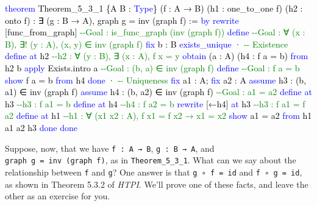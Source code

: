 \documentclass[
  letterpaper,
  DIV=11,
  numbers=noendperiod]{scrreprt}
\newenvironment{Shaded}{\begin{snugshade}}{\end{snugshade}}
\newcommand{\CommentTok}[1]{\textcolor[rgb]{0.37,0.37,0.37}{#1}}
\newcommand{\KeywordTok}[1]{\textcolor[rgb]{0.00,0.23,0.31}{#1}}
\newcommand{\NormalTok}[1]{\textcolor[rgb]{0.00,0.23,0.31}{#1}}
\renewcommand{\NormalTok}[1]{\textcolor[HTML]{000000}{#1}}
\renewcommand{\KeywordTok}[1]{\textcolor[HTML]{0000FF}{#1}}
\renewcommand{\CommentTok}[1]{\textcolor[HTML]{008000}{#1}}
\theoremstyle{remark}
\begin{document}
\begin{Shaded}
\begin{Highlighting}[]
\KeywordTok{theorem}\NormalTok{ Theorem\_5\_3\_1 \{A B : }\KeywordTok{Type}\NormalTok{\}}
\NormalTok{    (f : A → B) (h1 : one\_to\_one f) (h2 : onto f) :}
\NormalTok{    ∃ (g : B → A), graph g = inv (graph f) := }\KeywordTok{by}
  \KeywordTok{rewrite}\NormalTok{ [func\_from\_graph]   }\CommentTok{{-}{-}Goal : is\_func\_graph (inv (graph f))}
  \KeywordTok{define}        \CommentTok{{-}{-}Goal : ∀ (x : B), ∃! (y : A), (x, y) ∈ inv (graph f)}
  \KeywordTok{fix}\NormalTok{ b : B}
  \KeywordTok{exists\_unique}
\NormalTok{  · }\CommentTok{{-}{-} Existence}
    \KeywordTok{define} \KeywordTok{at}\NormalTok{ h2          }\CommentTok{{-}{-}h2 : ∀ (y : B), ∃ (x : A), f x = y}
    \KeywordTok{obtain}\NormalTok{ (a : A) (h4 : f a = b) }\KeywordTok{from}\NormalTok{ h2 b}
    \KeywordTok{apply}\NormalTok{ Exists.intro a  }\CommentTok{{-}{-}Goal : (b, a) ∈ inv (graph f)}
    \KeywordTok{define}                \CommentTok{{-}{-}Goal : f a = b}
    \KeywordTok{show}\NormalTok{ f a = b }\KeywordTok{from}\NormalTok{ h4}
    \KeywordTok{done}
\NormalTok{  · }\CommentTok{{-}{-} Uniqueness}
    \KeywordTok{fix}\NormalTok{ a1 : A; }\KeywordTok{fix}\NormalTok{ a2 : A}
    \KeywordTok{assume}\NormalTok{ h3 : (b, a1) ∈ inv (graph f)}
    \KeywordTok{assume}\NormalTok{ h4 : (b, a2) ∈ inv (graph f) }\CommentTok{{-}{-}Goal : a1 = a2}
    \KeywordTok{define} \KeywordTok{at}\NormalTok{ h3          }\CommentTok{{-}{-}h3 : f a1 = b}
    \KeywordTok{define} \KeywordTok{at}\NormalTok{ h4          }\CommentTok{{-}{-}h4 : f a2 = b}
    \KeywordTok{rewrite}\NormalTok{ [←h4] }\KeywordTok{at}\NormalTok{ h3   }\CommentTok{{-}{-}h3 : f a1 = f a2}
    \KeywordTok{define} \KeywordTok{at}\NormalTok{ h1          }\CommentTok{{-}{-}h1 : ∀ (x1 x2 : A), f x1 = f x2 → x1 = x2}
    \KeywordTok{show}\NormalTok{ a1 = a2 }\KeywordTok{from}\NormalTok{ h1 a1 a2 h3}
    \KeywordTok{done}
  \KeywordTok{done}
\end{Highlighting}
\end{Shaded}

Suppose, now, that we have \texttt{f\ :\ A\ →\ B},
\texttt{g\ :\ B\ →\ A}, and \texttt{graph\ g\ =\ inv\ (graph\ f)}, as in
\texttt{Theorem\_5\_3\_1}. What can we say about the relationship
between \texttt{f} and \texttt{g}? One answer is that
\texttt{g\ ∘\ f\ =\ id} and \texttt{f\ ∘\ g\ =\ id}, as shown in Theorem
5.3.2 of \emph{HTPI}. We'll prove one of these facts, and leave the
other as an exercise for you.
\end{document}
